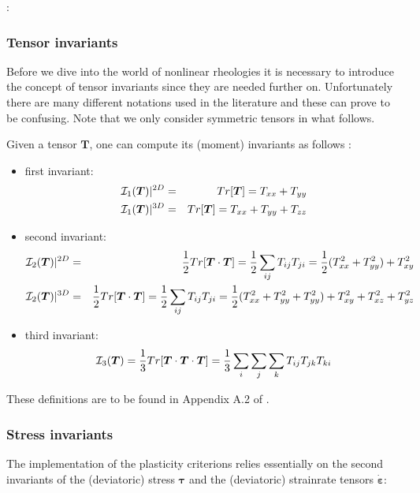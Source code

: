 
\Literature: \cite{mumc03,chpe15,momu06,muso11}

\subsubsection{Tensor invariants}\label{sec:invariants}

Before we dive into the world of nonlinear rheologies it is necessary to introduce the concept of tensor 
invariants since they are needed further on. 
Unfortunately there are many different notations used in the literature and these can prove to be 
confusing. Note that we only consider symmetric tensors in what follows.

Given a tensor $\bm{T}$,  one can compute its (moment) invariants as follows \cite[p.339]{reddybook2}: 
\begin{itemize}
\item first invariant:
\begin{eqnarray}
{\cal I}_1({\bm T})|^{2D} &=& Tr[\bm{T}] = T_{xx} + T_{yy} \nonumber\\
{\cal I}_1({\bm T})|^{3D} &=& Tr[\bm{T}] = T_{xx} + T_{yy} + T_{zz} 
\end{eqnarray}
\item second invariant:
\begin{eqnarray}
{\cal I}_2({\bm T})|^{2D} &=& \frac{1}{2} Tr[{\bm T}\cdot{\bm T}] = \frac{1}{2} \sum_{ij} T_{ij} T_{ji} = \frac{1}{2} (T_{xx}^2 + T_{yy}^2) + T_{xy}^2 \nonumber\\
{\cal I}_2({\bm T})|^{3D} &=& \frac{1}{2} Tr[{\bm T}\cdot{\bm T}] = \frac{1}{2} \sum_{ij} T_{ij} T_{ji} = \frac{1}{2} (T_{xx}^2 + T_{yy}^2 + T_{yy}^2) + T_{xy}^2 + T_{xz}^2 + T_{yz}^2 
\end{eqnarray}
\item third invariant: 
\begin{equation}
{\cal I}_3({\bm T}) = \frac{1}{3} Tr[{\bm T}\cdot{\bm T}\cdot {\bm T}]  = \frac{1}{3}\sum_i\sum_j \sum_k T_{ij} T_{jk} T_{ki} 
\end{equation}
\end{itemize}
These definitions are to be found in Appendix A.2 of \cite{zita2}.
 

\subsubsection{Stress invariants}\label{sec:stress_invariants}

The implementation of the plasticity criterions relies essentially 
on the second invariants of the (deviatoric) stress ${\bm \tau}$ 
and the (deviatoric) strainrate tensors $\dot{\bm \varepsilon}$:

